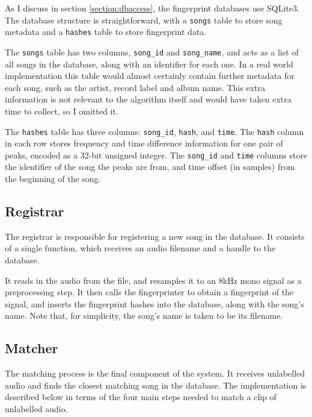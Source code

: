 \documentclass[12pt,a4paper,twoside,openright]{report}
\begin{document}
As I discuss in section \ref{section:dbaccess}, the fingerprint databases use SQLite3. The database structure is straightforward, with a \lstinline{songs} table to store song metadata and a \lstinline{hashes} table to store fingerprint data.

The \lstinline{songs} table has two columns, \lstinline{song_id} and \lstinline{song_name}, and acts as a list of all songs in the database, along with an identifier for each one. In a real world implementation this table would almost certainly contain further metadata for each song, such as the artist, record label and album name. This extra information is not relevant to the algorithm itself and would have taken extra time to collect, so I omitted it.

The \lstinline{hashes} table has three columns: \lstinline{song_id}, \lstinline{hash}, and \lstinline{time}. The \lstinline{hash} column in each row stores frequency and time difference information for one pair of peaks, encoded as a 32-bit unsigned integer. The \lstinline{song_id} and \lstinline{time} columns store the identifier of the song the peaks are from, and time offset (in samples) from the beginning of the song.


\subsection{Registrar}
\label{shazam:registrar}

The registrar is responsible for registering a new song in the database. It consists of a single function, which receives an audio filename and a handle to the database. 

It reads in the audio from the file, and resamples it to an 8kHz mono signal as a preprocessing step. It then calls the fingerprinter to obtain a fingerprint of the signal, and inserts the fingerprint hashes into the database, along with the song's name. Note that, for simplicity, the song's name is taken to be its filename.


\subsection{Matcher}
\label{shazam:matcher}

The matching process is the final component of the system. It receives unlabelled audio and finds the closest matching song in the database. The implementation is described below in terms of the four main steps needed to match a clip of unlabelled audio.
\end{document}

